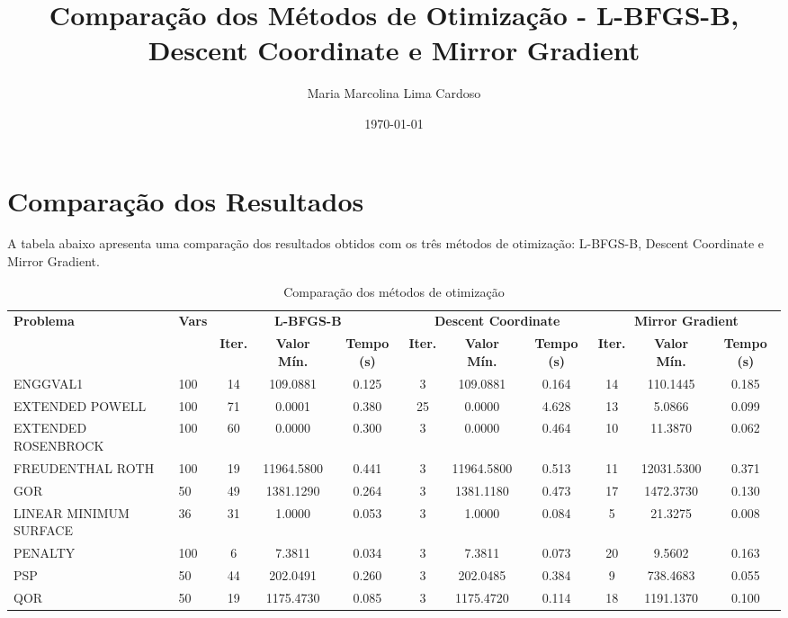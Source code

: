\documentclass[12pt]{article}
\title{Comparação dos Métodos de Otimização - L-BFGS-B, Descent Coordinate e Mirror Gradient}
\author{Maria Marcolina Lima Cardoso}
\date{\today}
\begin{document}
\maketitle

\section{Comparação dos Resultados}

A tabela abaixo apresenta uma comparação dos resultados obtidos com os três métodos de otimização: L-BFGS-B, Descent Coordinate e Mirror Gradient.

\begin{landscape}
\begin{table}[h!]
\centering
\caption{Comparação dos métodos de otimização}
\label{tab:comparacao}
\footnotesize
\begin{tabular}{@{}ll|ccc|ccc|ccc@{}}
\toprule
\multirow{2}{*}{\textbf{Problema}} & \multirow{2}{*}{\textbf{Vars}} & \multicolumn{3}{c|}{\textbf{L-BFGS-B}} & \multicolumn{3}{c|}{\textbf{Descent Coordinate}} & \multicolumn{3}{c}{\textbf{Mirror Gradient}} \\
\cmidrule(lr){3-5} \cmidrule(lr){6-8} \cmidrule(lr){9-11}
& & \textbf{Iter.} & \textbf{Valor Mín.} & \textbf{Tempo (s)} & \textbf{Iter.} & \textbf{Valor Mín.} & \textbf{Tempo (s)} & \textbf{Iter.} & \textbf{Valor Mín.} & \textbf{Tempo (s)} \\
\midrule
ENGGVAL1 & 100 & 14 & 109.0881 & 0.125 & 3 & 109.0881 & 0.164 & 14 & 110.1445 & 0.185 \\
EXTENDED POWELL & 100 & 71 & 0.0001 & 0.380 & 25 & 0.0000 & 4.628 & 13 & 5.0866 & 0.099 \\
EXTENDED ROSENBROCK & 100 & 60 & 0.0000 & 0.300 & 3 & 0.0000 & 0.464 & 10 & 11.3870 & 0.062 \\
FREUDENTHAL ROTH & 100 & 19 & 11964.5800 & 0.441 & 3 & 11964.5800 & 0.513 & 11 & 12031.5300 & 0.371 \\
GOR & 50 & 49 & 1381.1290 & 0.264 & 3 & 1381.1180 & 0.473 & 17 & 1472.3730 & 0.130 \\
LINEAR MINIMUM SURFACE & 36 & 31 & 1.0000 & 0.053 & 3 & 1.0000 & 0.084 & 5 & 21.3275 & 0.008 \\
PENALTY & 100 & 6 & 7.3811 & 0.034 & 3 & 7.3811 & 0.073 & 20 & 9.5602 & 0.163 \\
PSP & 50 & 44 & 202.0491 & 0.260 & 3 & 202.0485 & 0.384 & 9 & 738.4683 & 0.055 \\
QOR & 50 & 19 & 1175.4730 & 0.085 & 3 & 1175.4720 & 0.114 & 18 & 1191.1370 & 0.100 \\

\end{tabular}
\end{table}
\end{landscape}
\end{document}
